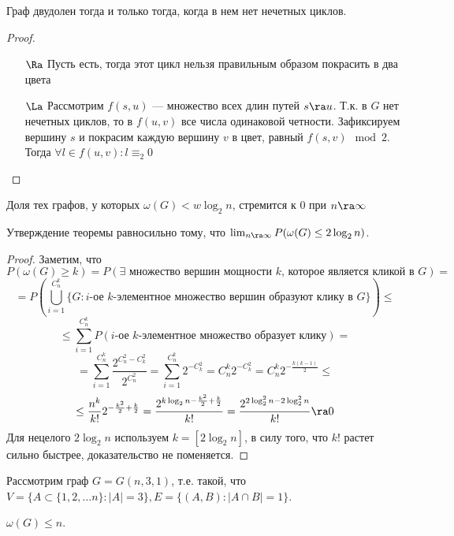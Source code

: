 \begin{proposition}
    Граф двудолен тогда и только тогда, когда в нем нет нечетных циклов.
\end{proposition}
\begin{proof}
    \begin{enumerate}
        \item[\(\Ra\)] Пусть есть, тогда этот цикл нельзя правильным образом покрасить в два цвета
        \item[\(\La\)] Рассмотрим \(f(s, u)\) --- множество всех длин путей \(s \ra u\). Т.к. в \(G\) нет нечетных циклов, то в \(f(u, v)\) все числа одинаковой четности. Зафиксируем вершину \(s\) и покрасим каждую вершину \(v\) в цвет, равный \(f(s, v) \mod 2\). Тогда \(\forall l \in f(u, v): l \equiv_2 0\)
    \end{enumerate}
\end{proof}

\begin{theorem}
    Доля тех графов, у которых \(\omega(G) < w\log_2 n\), стремится к \(0\) при \(n \ra \infty\)
\end{theorem}
\begin{note}
    Утверждение теоремы равносильно тому, что \(\lim_{n \ra \infty} P(\omega(G) \le 2 \log_2 n)\).
\end{note}
\begin{proof}
    Заметим, что
    \[P(\omega(G) \ge k) = P(\exists \text{ множество вершин мощности \(k\), которое является кликой в \(G\)}) =\]
    \[ = P\left(\bigcup_{i = 1}^{C_n^k} \{G: \text{\(i\)-ое \(k\)-элементное множество вершин образуют клику в \(G\)}\}\right) \le\]
    \[\le \sum_{i = 1}^{C_n^k}P(\text{\(i\)-ое \(k\)-элементное множество образует клику}) = \]
    \[= \sum_{i = 1}^{C_n^k} \frac{2^{C_n^2 - C_k^2}}{2^{C_n^2}} = \sum_{i = 1}^{C_n^k} 2^{-C_k^2} = C_n^k 2^{-C_k^2} = C_n^k2^{-\frac{k(k - 1)}{2}} \le\]
    \[\le \frac{n^k}{k!}2^{-\frac{k^2}{2} + \frac{k}{2}} = \frac{2^{k\log_2 n - \frac{k^2}{2} + \frac{k}{2}}}{k!} = \frac{2^{2\log_2^2n - 2\log_2^2n}}{k!} \ra 0\]
    Для нецелого \(2\log_2n\) используем \(k = [2\log_2n]\), в силу того, что \(k!\) растет сильно быстрее, доказательство не поменяется.
\end{proof}

Рассмотрим граф \(G = G(n, 3, 1)\), т.е. такой, что \(V = \{A \subset \{1, 2, \dots n\}: |A| = 3\}, E = \{(A, B): |A \cap B| = 1\}\).

\begin{proposition}
    \(\omega(G) \le n\).
\end{proposition}

